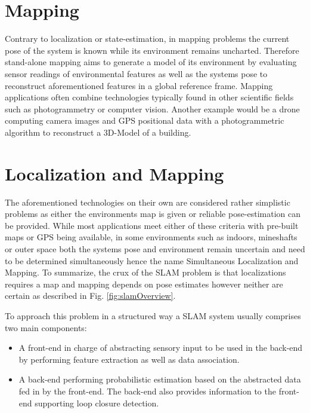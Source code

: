 \section{Mapping}
Contrary to localization or state-estimation, in mapping problems the current pose of the system is known while its environment remains uncharted.
Therefore stand-alone mapping aims to generate a model of its environment by evaluating sensor readings of environmental features as well as the systems pose to reconstruct aforementioned features in a global reference frame. 
Mapping applications often combine technologies typically found in other scientific fields such as photogrammetry or computer vision.
Another example would be a drone computing camera images and GPS positional data with a photogrammetric algorithm to reconstruct a 3D-Model of a building. 


\section{Localization and Mapping}
The aforementioned technologies on their own are considered rather simplistic problems as either the environments map is given or reliable pose-estimation can be provided. While most applications meet either of these criteria with pre-built maps or GPS being available, in some environments such as indoors, mineshafts or outer space both the systems pose and environment remain uncertain and need to be determined simultaneously hence the name Simultaneous Localization and Mapping. 
To summarize, the crux of the SLAM problem is that localizations requires a map and mapping depends on pose estimates however neither are certain as described in Fig. \ref{fig:slamOverview}.


To approach this problem in a structured way a SLAM system usually comprises two main components:
\begin{itemize}
	\item A front-end in charge of abstracting sensory input to be used in the back-end by performing feature extraction as well as data association. 
	\item A back-end performing probabilistic estimation based on the abstracted data fed in by the front-end. The back-end also provides information to the front-end supporting loop closure detection. 
\end{itemize}

